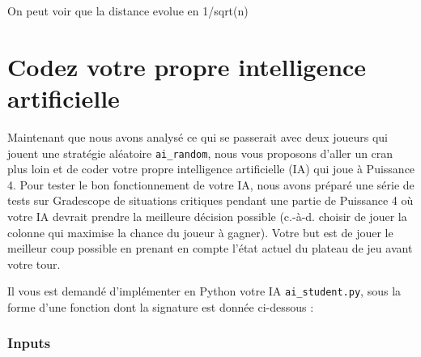 \documentclass[11pt,answers]{exam}
\begin{document}
\begin{solutionbox}{25mm}
On peut voir que la distance evolue en 1/sqrt(n)

\end{solutionbox}

\newpage

\section{Codez votre propre intelligence artificielle}

Maintenant que nous avons analysé ce qui se passerait avec deux joueurs qui jouent une stratégie aléatoire \texttt{ai\_random}, nous vous proposons d’aller un cran plus loin et de coder votre propre intelligence artificielle (IA) qui joue à Puissance 4. 
Pour tester le bon fonctionnement de votre IA, nous avons préparé une série de tests sur Gradescope de situations critiques pendant une partie de Puissance 4 où votre IA devrait prendre la meilleure décision possible (c.-à-d. choisir de jouer la colonne qui maximise la chance du joueur à gagner). Votre but est de jouer le meilleur coup possible en prenant en compte l'état actuel du plateau de jeu avant votre tour.

\medskip

Il vous est demandé d'implémenter en Python votre IA \texttt{ai\_student.py}, sous la forme d'une fonction dont la signature est donnée ci-dessous :




\subsubsection*{Inputs}
\end{document}
